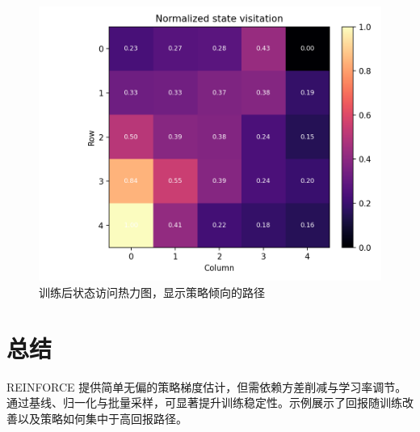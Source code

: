 \documentclass[UTF8,zihao=-4]{ctexart}
\begin{document}
\begin{figure}[H]
  \centering
  \includegraphics[width=0.82\linewidth]{reinforce_state_visitation.png}
  \caption{训练后状态访问热力图，显示策略倾向的路径}
  \label{fig:reinforce_state_visitation_cn}
\end{figure}

\FloatBarrier
\section{总结}
REINFORCE 提供简单无偏的策略梯度估计，但需依赖方差削减与学习率调节。通过基线、归一化与批量采样，可显著提升训练稳定性。示例展示了回报随训练改善以及策略如何集中于高回报路径。
\end{document}
